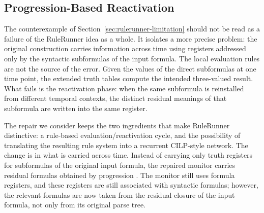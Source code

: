 \subsection{Progression-Based Reactivation}
\label{sec:rulerunner-progression}

The counterexample of Section~\ref{sec:rulerunner-limitation} should not be read as a failure of the RuleRunner idea as a whole. It isolates a more precise problem: the original construction carries information across time using registers addressed only by the syntactic subformulas of the input formula. The local evaluation rules are not the source of the error. Given the values of the direct subformulas at one time point, the extended truth tables compute the intended three-valued result. What fails is the reactivation phase: when the same subformula is reinstalled from different temporal contexts, the distinct residual meanings of that subformula are written into the same register.

The repair we consider keeps the two ingredients that make RuleRunner distinctive: a rule-based evaluation/reactivation cycle, and the possibility of translating the resulting rule system into a recurrent CILP-style network. The change is in what is carried across time. Instead of carrying only truth registers for subformulas of the original input formula, the repaired monitor carries residual formulas obtained by progression \cite{emerson90,bacchus&kabanza98}. The monitor still uses formula registers, and these registers are still associated with syntactic formulas; however, the relevant formulas are now taken from the residual closure of the input formula, not only from its original parse tree.

